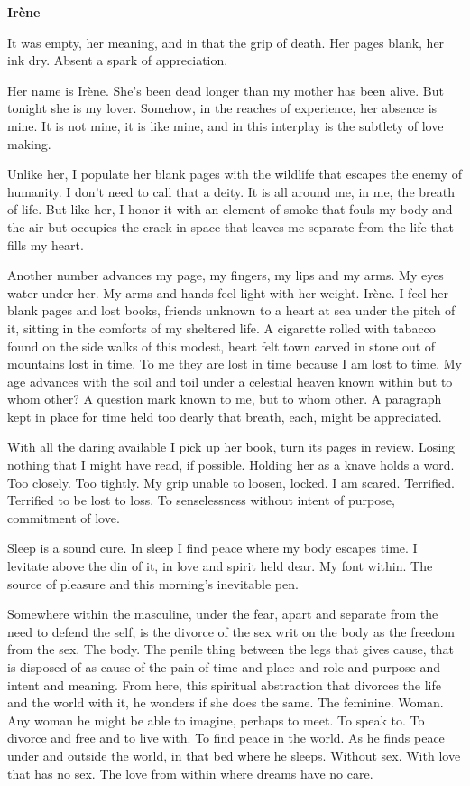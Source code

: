 

\centerline{\bf Ir\`{e}ne}


\vfill
\break

It was empty, her meaning, and in that the grip of death.  Her pages
blank, her ink dry.  Absent a spark of appreciation.

Her name is Ir\`{e}ne.  She's been dead longer than my mother has been
alive.  But tonight she is my lover.  Somehow, in the reaches of
experience, her absence is mine.  It is not mine, it is like mine, and
in this interplay is the subtlety of love making.

Unlike her, I populate her blank pages with the wildlife that escapes
the enemy of humanity.  I don't need to call that a deity.  It is all
around me, in me, the breath of life.  But like her, I honor it with
an element of smoke that fouls my body and the air but occupies the
crack in space that leaves me separate from the life that fills my
heart.

\vfill
\break

﻿Another number advances my page, my fingers, my lips and my arms.  My
eyes water under her.  My arms and hands feel light with her weight.
Ir\`{e}ne.  I feel her blank pages and lost books, friends unknown to a
heart at sea under the pitch of it, sitting in the comforts of my
sheltered life.  A cigarette rolled with tabacco found on the side
walks of this modest, heart felt town carved in stone out of mountains
lost in time.  To me they are lost in time because I am lost to time.
My age advances with the soil and toil under a celestial heaven known
within but to whom other?  A question mark known to me, but to whom
other.  A paragraph kept in place for time held too dearly that
breath, each, might be appreciated.

With all the daring available I pick up her book, turn its pages in
review.  Losing nothing that I might have read, if possible.  Holding
her as a knave holds a word.  Too closely.  Too tightly.  My grip
unable to loosen, locked.  I am scared.  Terrified.  Terrified to be
lost to loss.  To senselessness without intent of purpose, commitment
of love.

Sleep is a sound cure.  In sleep I find peace where my body escapes
time.  I levitate above the din of it, in love and spirit held dear.
My font within.  The source of pleasure and this morning's inevitable
pen.

\vfill
\break

﻿Somewhere within the masculine, under the fear, apart and separate
from the need to defend the self, is the divorce of the sex writ on
the body as the freedom from the sex.  The body.  The penile thing
between the legs that gives cause, that is disposed of as cause of the
pain of time and place and role and purpose and intent and meaning.
From here, this spiritual abstraction that divorces the life and the
world with it, he wonders if she does the same.  The feminine.  Woman.
Any woman he might be able to imagine, perhaps to meet.  To speak to.
To divorce and free and to live with.  To find peace in the world.  As
he finds peace under and outside the world, in that bed where he
sleeps.  Without sex.  With love that has no sex.  The love from
within where dreams have no care.

